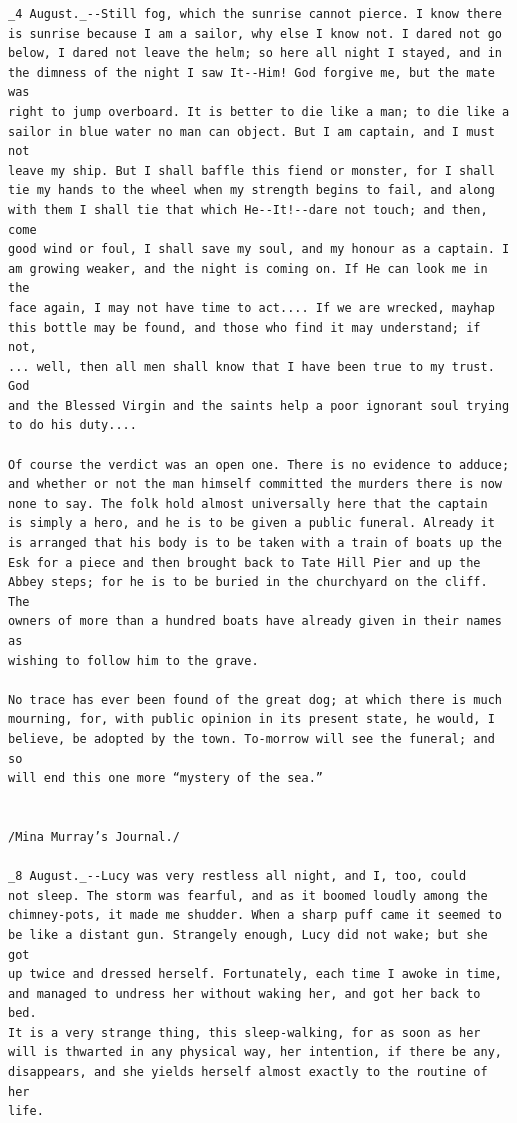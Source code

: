 \documentclass{article}
\begin{document}
\begin{verbatim}
_4 August._--Still fog, which the sunrise cannot pierce. I know there
is sunrise because I am a sailor, why else I know not. I dared not go
below, I dared not leave the helm; so here all night I stayed, and in
the dimness of the night I saw It--Him! God forgive me, but the mate was
right to jump overboard. It is better to die like a man; to die like a
sailor in blue water no man can object. But I am captain, and I must not
leave my ship. But I shall baffle this fiend or monster, for I shall
tie my hands to the wheel when my strength begins to fail, and along
with them I shall tie that which He--It!--dare not touch; and then, come
good wind or foul, I shall save my soul, and my honour as a captain. I
am growing weaker, and the night is coming on. If He can look me in the
face again, I may not have time to act.... If we are wrecked, mayhap
this bottle may be found, and those who find it may understand; if not,
... well, then all men shall know that I have been true to my trust. God
and the Blessed Virgin and the saints help a poor ignorant soul trying
to do his duty....

Of course the verdict was an open one. There is no evidence to adduce;
and whether or not the man himself committed the murders there is now
none to say. The folk hold almost universally here that the captain
is simply a hero, and he is to be given a public funeral. Already it
is arranged that his body is to be taken with a train of boats up the
Esk for a piece and then brought back to Tate Hill Pier and up the
Abbey steps; for he is to be buried in the churchyard on the cliff. The
owners of more than a hundred boats have already given in their names as
wishing to follow him to the grave.

No trace has ever been found of the great dog; at which there is much
mourning, for, with public opinion in its present state, he would, I
believe, be adopted by the town. To-morrow will see the funeral; and so
will end this one more “mystery of the sea.”


/Mina Murray’s Journal./

_8 August._--Lucy was very restless all night, and I, too, could
not sleep. The storm was fearful, and as it boomed loudly among the
chimney-pots, it made me shudder. When a sharp puff came it seemed to
be like a distant gun. Strangely enough, Lucy did not wake; but she got
up twice and dressed herself. Fortunately, each time I awoke in time,
and managed to undress her without waking her, and got her back to bed.
It is a very strange thing, this sleep-walking, for as soon as her
will is thwarted in any physical way, her intention, if there be any,
disappears, and she yields herself almost exactly to the routine of her
life.


\end{verbatim}
\end{document}
